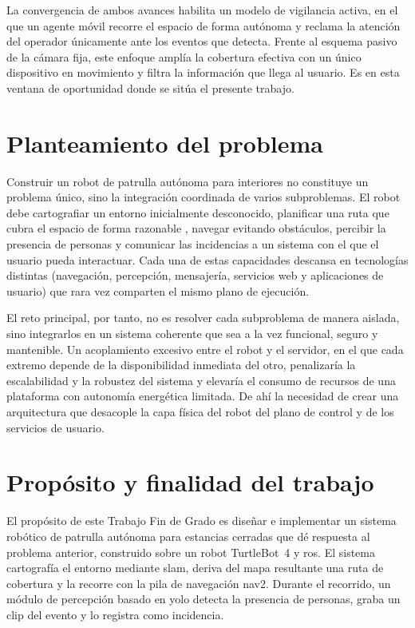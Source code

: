 La convergencia de ambos avances habilita un modelo de vigilancia activa, en el
que un agente móvil recorre el espacio de forma autónoma y reclama la atención del
operador únicamente ante los eventos que detecta. Frente al esquema pasivo de la
cámara fija, este enfoque amplía la cobertura efectiva con un único dispositivo en
movimiento y filtra la información que llega al usuario. Es en esta ventana de oportunidad 
donde se sitúa el presente trabajo.

\section{Planteamiento del problema}
\label{sec:planteamiento-problema}

Construir un robot de patrulla autónoma para interiores no constituye un problema
único, sino la integración coordinada de varios subproblemas. El robot debe
cartografiar un entorno inicialmente desconocido, planificar una ruta que cubra el
espacio de forma razonable \parencite{galceran2013coverage}, navegar evitando
obstáculos, percibir la presencia de personas y comunicar las incidencias a un
sistema con el que el usuario pueda interactuar. Cada una de estas capacidades
descansa en tecnologías distintas (navegación, percepción, mensajería, servicios
web y aplicaciones de usuario) que rara vez comparten el mismo plano de ejecución.

El reto principal, por tanto, no es resolver cada subproblema de manera aislada,
sino integrarlos en un sistema coherente que sea a la vez funcional, seguro y
mantenible. Un acoplamiento excesivo entre el robot y el servidor, en el que cada extremo
depende de la disponibilidad inmediata del otro, penalizaría la escalabilidad y
la robustez del sistema y elevaría el consumo de recursos de una plataforma con
autonomía energética limitada. De ahí la necesidad
de crear una arquitectura que desacople la capa física del robot del plano de control y
de los servicios de usuario.

\section{Propósito y finalidad del trabajo}
\label{sec:proposito}

El propósito de este Trabajo Fin de Grado es diseñar e implementar un sistema
robótico de patrulla autónoma para estancias cerradas que dé respuesta al problema
anterior, construido sobre un robot \mbox{TurtleBot~4} y \gls{ros}. El sistema
cartografía el entorno mediante \gls{slam}, deriva del mapa resultante una ruta de
cobertura y la recorre con la pila de navegación \gls{nav2}. Durante el recorrido,
un módulo de percepción basado en \gls{yolo} detecta la presencia de personas,
graba un clip del evento y lo registra como incidencia.

